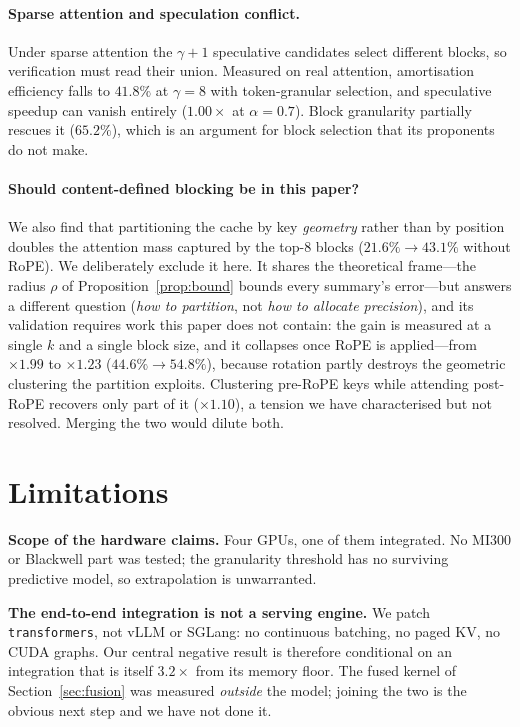 \documentclass[sigconf,nonacm,11pt]{acmart}
\begin{document}
\paragraph{Sparse attention and speculation conflict.} Under sparse attention the
$\gamma+1$ speculative candidates select different blocks, so verification must
read their union. Measured on real attention, amortisation efficiency falls to
$41.8\%$ at $\gamma=8$ with token-granular selection, and speculative speedup can
vanish entirely ($1.00\times$ at $\alpha=0.7$). Block granularity partially
rescues it ($65.2\%$), which is an argument for block selection that its
proponents do not make.

\paragraph{Should content-defined blocking be in this paper?} We also find that
partitioning the cache by key \emph{geometry} rather than by position doubles the
attention mass captured by the top-8 blocks ($21.6\%\to43.1\%$ without RoPE).
We deliberately exclude it here. It shares the theoretical frame---the radius
$\rho$ of Proposition~\ref{prop:bound} bounds every summary's error---but answers
a different question (\emph{how to partition}, not \emph{how to allocate
precision}), and its validation requires work this paper does not contain: the
gain is measured at a single $k$ and a single block size, and it collapses once
RoPE is applied---from $\times1.99$ to $\times1.23$ ($44.6\%\to54.8\%$), because
rotation partly destroys the geometric clustering the partition exploits.
Clustering pre-RoPE keys while attending post-RoPE recovers only part of it
($\times1.10$), a tension we have characterised but not resolved. Merging the two would dilute both.

\section{Limitations}

\textbf{Scope of the hardware claims.} Four GPUs, one of them integrated. No
MI300 or Blackwell part was tested; the granularity threshold has no surviving
predictive model, so extrapolation is unwarranted.

\textbf{The end-to-end integration is not a serving engine.} We patch
\texttt{transformers}, not vLLM or SGLang: no continuous batching, no paged KV,
no CUDA graphs. Our central negative result is therefore conditional on an
integration that is itself $3.2\times$ from its memory floor. The fused kernel of
Section~\ref{sec:fusion} was measured \emph{outside} the model; joining the two is
the obvious next step and we have not done it.
\end{document}

